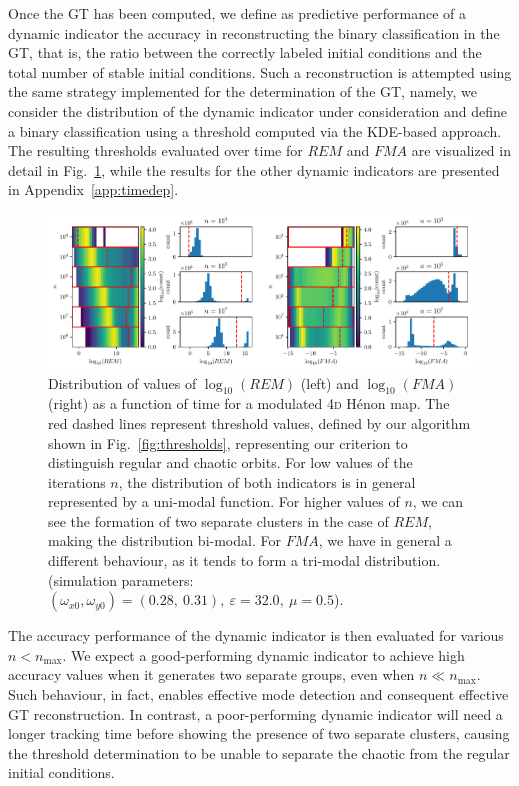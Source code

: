 Once the GT has been computed, we define as predictive performance of a dynamic indicator the accuracy in reconstructing the binary classification in the GT, that is, the ratio between the correctly labeled initial conditions and the total number of stable initial conditions. Such a reconstruction is attempted using the same strategy implemented for the determination of the GT, namely, we consider the distribution of the dynamic indicator under consideration and define a binary classification using a threshold computed via the KDE-based approach. The resulting thresholds evaluated over time for $REM$ and $FMA$ are visualized in detail in Fig.~\ref{fig:neo_evolution}, while the results for the other dynamic indicators are presented in Appendix~\ref{app:timedep}.

\begin{figure}[htp]
    \centering
    \includegraphics[width=1.0\textwidth]{6_dynamic_indicators/fig/corrected_figs/neo_evolution_idx_3.pdf}
    \caption{Distribution of values of $\log_{10}(REM)$ (left) and $\log_{10}(FMA)$ (right) as a function of time for a modulated 4\textsc{d} Hénon map. The red dashed lines represent threshold values, defined by our algorithm shown in Fig.~\ref{fig:thresholds}, representing our criterion to distinguish regular and chaotic orbits.
    For low values of the iterations $n$, the distribution of both indicators is in general represented by a uni-modal function. For higher values of $n$, we can see the formation of two separate clusters in the case of $REM$, making the distribution bi-modal. For $FMA$, we have in general a different behaviour, as it tends to form a tri-modal distribution. (simulation parameters: $(\omega_{x0},\omega_{y0})= (0.28,\ 0.31),\ \varepsilon=32.0,\ \mu=0.5$).}
    \label{fig:neo_evolution}
\end{figure}

The accuracy performance of the dynamic indicator is then evaluated for various $n < n_{\text{max}}$. We expect a good-performing dynamic indicator to achieve high accuracy values when it generates two separate groups, even when $n \ll n_{\text{max}}$. Such behaviour, in fact, enables effective mode detection and consequent effective GT reconstruction. In contrast, a poor-performing dynamic indicator will need a longer tracking time before showing the presence of two separate clusters, causing the threshold determination to be unable to separate the chaotic from the regular initial conditions.

